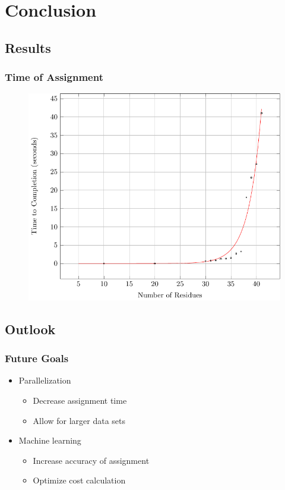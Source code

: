 \documentclass{beamer}
\begin{document}
\section{Conclusion}

\subsection{Results}

\begin{frame}
	\frametitle{Time of Assignment}
	\begin{figure}[H]
	\begin{center}
	\includegraphics[width=.65\textwidth]{plot}
	\end{center}
	\end{figure}
\end{frame}


\subsection{Outlook}
\begin{frame}
	\frametitle{Future Goals}
	\begin{itemize}
		\item Parallelization
		\begin{itemize}
			\item Decrease assignment time
			\item Allow for larger data sets
		\end{itemize}
		\item Machine learning 
		\begin{itemize}
			\item Increase accuracy of assignment
			\item Optimize cost calculation
		\end{itemize}
	\end{itemize}
\end{frame}
\end{document}
